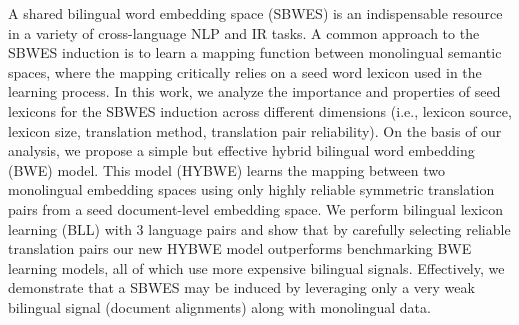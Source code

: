 A shared bilingual word embedding space ({\sc SBWES}) is an indispensable resource in a variety of cross-language NLP and IR tasks. A common approach to the {\sc SBWES} induction is to learn a mapping function between monolingual semantic spaces, where the mapping critically relies on a seed word lexicon used in the learning process. In this work, we analyze the importance and properties of seed lexicons for the {\sc SBWES} induction across different dimensions (i.e., lexicon source, lexicon size, translation method, translation pair reliability). On the basis of our analysis, we propose a simple but effective hybrid bilingual word embedding (BWE) model. This model (HYBWE) learns the mapping between two monolingual embedding spaces using only highly reliable symmetric translation pairs from a seed document-level embedding space. We perform bilingual lexicon learning (BLL) with 3 language pairs and show that by carefully selecting reliable translation pairs our new HYBWE model outperforms benchmarking BWE learning models, all of which use more expensive bilingual signals. Effectively, we demonstrate that a {\sc SBWES} may be induced by leveraging only a very weak bilingual signal (document alignments) along with monolingual data.

